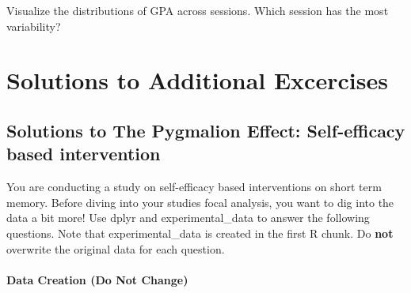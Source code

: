 \documentclass[]{book}
\theoremstyle{definition}
\theoremstyle{definition}
\theoremstyle{definition}
\theoremstyle{remark}
\begin{document}
Visualize the distributions of GPA across sessions. Which session has the most variability?

\hypertarget{part-solutions-to-additional-excercises}{%
\part{Solutions to Additional Excercises}\label{part-solutions-to-additional-excercises}}

\hypertarget{solutions-to-the-pygmalion-effect-self-efficacy-based-intervention}{%
\chapter{Solutions to The Pygmalion Effect: Self-efficacy based intervention}\label{solutions-to-the-pygmalion-effect-self-efficacy-based-intervention}}

You are conducting a study on self-efficacy based interventions on short term memory. Before diving into your studies focal analysis, you want to dig into the data a bit more! Use dplyr and experimental\_data to answer the following questions. Note that experimental\_data is created in the first R chunk. Do \textbf{not} overwrite the original data for each question.

\hypertarget{data-creation-do-not-change-1}{%
\subsection{Data Creation (Do Not Change)}\label{data-creation-do-not-change-1}}
\end{document}
